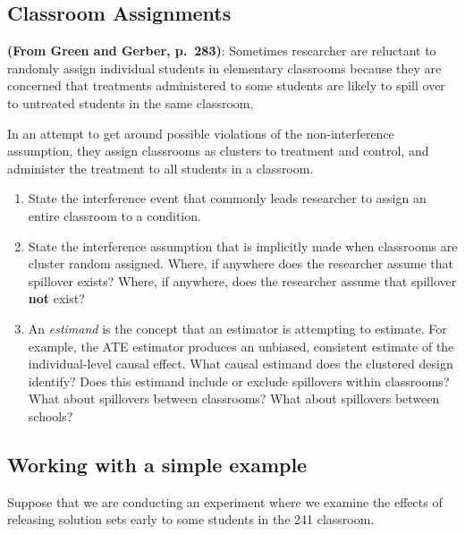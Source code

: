 \documentclass[
]{book}
\providecommand{\tightlist}{%
  \setlength{\itemsep}{0pt}\setlength{\parskip}{0pt}}
\begin{document}
\hypertarget{classroom-assignments}{%
\subsection{Classroom Assignments}\label{classroom-assignments}}

\textbf{(From Green and Gerber, p.~283)}: Sometimes researcher are
reluctant to randomly assign individual students in elementary
classrooms because they are concerned that treatments administered to
some students are likely to spill over to untreated students in the same
classroom.

In an attempt to get around possible violations of the non-interference
assumption, they assign classrooms as clusters to treatment and control,
and administer the treatment to all students in a classroom.

\begin{enumerate}
\def\labelenumi{\arabic{enumi}.}
\tightlist
\item
  State the interference event that commonly leads researcher to assign
  an entire classroom to a condition.
\item
  State the interference assumption that is implicitly made when
  classrooms are cluster random assigned. Where, if anywhere does the
  researcher assume that spillover exists? Where, if anywhere, does the
  researcher assume that spillover \textbf{not} exist?
\item
  An \emph{estimand} is the concept that an estimator is attempting to
  estimate. For example, the ATE estimator produces an unbiased,
  consistent estimate of the individual-level causal effect. What causal
  estimand does the clustered design identify? Does this estimand
  include or exclude spillovers within classrooms? What about spillovers
  between classrooms? What about spillovers between schools?
\end{enumerate}

\hypertarget{working-with-a-simple-example}{%
\subsection{Working with a simple
example}\label{working-with-a-simple-example}}

Suppose that we are conducting an experiment where we examine the
effects of releasing solution sets early to some students in the 241
classroom.
\end{document}

